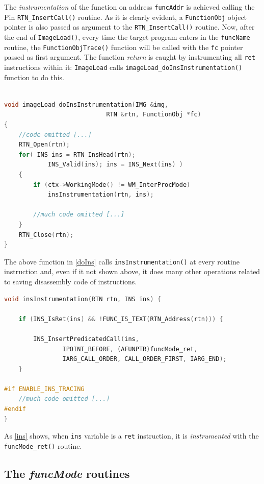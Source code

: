 \documentclass[a4paper,10pt]{report}
\begin{document}
\noindent
The \emph{instrumentation} of the function on address \verb|funcAddr| is achieved 
calling the Pin \verb|RTN_InsertCall()| routine. 
As it is clearly evident, a \verb|FunctionObj| object pointer is also passed as
argument to the \verb|RTN_InsertCall()| routine. 
Now, after the end of \verb|ImageLoad()|, every time the target program
enters in the \verb|funcName| routine, the \verb|FunctionObjTrace()| function 
will be called with the \verb|fc| pointer passed as first argument.
The function \emph{return} is caught by instrumenting all \verb|ret| instructions
within it: \verb|ImageLoad| calls \verb|imageLoad_doInsInstrumentation()| function
to do this. 

\begin{lstlisting}[language=C++, 
	caption={a fragment of \texttt{imageLoad\_doInsInstrumentation()} routine}, 
	label=doIns, frame=leftline]	

void imageLoad_doInsInstrumentation(IMG &img, 
							RTN &rtn, FunctionObj *fc) 
{
	//code omitted [...]
	RTN_Open(rtn);
	for( INS ins = RTN_InsHead(rtn); 
			INS_Valid(ins); ins = INS_Next(ins) ) 
	{
		if (ctx->WorkingMode() != WM_InterProcMode)
			insInstrumentation(rtn, ins);	

		//much code omitted [...]		
	}
	RTN_Close(rtn);
}
\end{lstlisting}

\noindent
The above function in \cref{doIns} calls \verb|insInstrumentation()| at every routine instruction and, even if it not shown above, it does many other operations 
related to saving disassembly code of instructions.

\begin{lstlisting}[language=C++, 
	caption={a fragment of \texttt{insInstrumentation()} routine}, 
	label=ins, frame=leftline]
void insInstrumentation(RTN rtn, INS ins) {

	if (INS_IsRet(ins) && !FUNC_IS_TEXT(RTN_Address(rtn))) {

		INS_InsertPredicatedCall(ins, 
				IPOINT_BEFORE, (AFUNPTR)funcMode_ret, 
				IARG_CALL_ORDER, CALL_ORDER_FIRST, IARG_END);
	}

#if ENABLE_INS_TRACING
	//much code omitted [...]	
#endif
}

\end{lstlisting}

\noindent
As \cref{ins} shows, when \verb|ins| variable is a \verb|ret| instruction,  
it is \emph{instrumented} with the \verb|funcMode_ret()| routine.

\subsection{The \emph{funcMode} routines}
\end{document}

